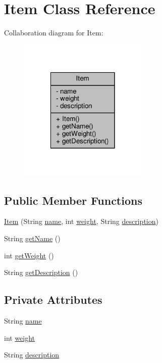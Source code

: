 \hypertarget{classItem}{\section{Item Class Reference}
\label{classItem}
}


Collaboration diagram for Item\-:
\nopagebreak
\begin{figure}[H]
\begin{center}
\leavevmode
\includegraphics[width=174pt]{classItem__coll__graph}
\end{center}
\end{figure}
\subsection*{Public Member Functions}
\begin{DoxyCompactItemize}
\item 
\hyperlink{classItem_acf7048ce82d4f6f047d926b1f6260f7c}{Item} (String \hyperlink{classItem_a42fd6d4796fcf652806278f65ce93a3b}{name}, int \hyperlink{classItem_ade554833393860faaece5e514637b5d0}{weight}, String \hyperlink{classItem_a663fa7220137071baee5c660b01a82df}{description})
\item 
String \hyperlink{classItem_a78dd5a8370c5267c3f1f992167ab84ac}{get\-Name} ()
\item 
int \hyperlink{classItem_a2ff9daec3cf9585fb5741062447a779d}{get\-Weight} ()
\item 
String \hyperlink{classItem_abfe361bd046f5acdf4946bda076a8c8f}{get\-Description} ()
\end{DoxyCompactItemize}
\subsection*{Private Attributes}
\begin{DoxyCompactItemize}
\item 
String \hyperlink{classItem_a42fd6d4796fcf652806278f65ce93a3b}{name}
\item 
int \hyperlink{classItem_ade554833393860faaece5e514637b5d0}{weight}
\item 
String \hyperlink{classItem_a663fa7220137071baee5c660b01a82df}{description}
\end{DoxyCompactItemize}


